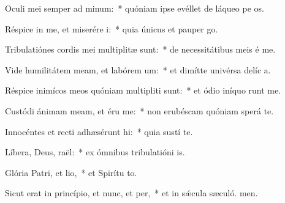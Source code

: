 \item Oculi mei semper ad minum:~* quóniam ipse evéllet de láqueo pe os.
\item Réspice in me, et miserére i:~* quia únicus et pauper  go.
\item Tribulatiónes cordis mei multiplitæ sunt:~* de necessitátibus meis é me.
\item Vide humilitátem meam, et labórem um:~* et dimítte univérsa delíc a.
\item Réspice inimícos meos quóniam multipliti sunt:~* et ódio iníquo runt me.
\item Custódi ánimam meam, et éru me:~* non erubéscam quóniam sperá  te.
\item Innocéntes et recti adhæsérunt hi:~* quia sustí te.
\item Líbera, Deus, raël:~* ex ómnibus tribulatióni is.
\item Glória Patri, et lio,~* et Spirítu to.
\item Sicut erat in princípio, et nunc, et per,~* et in sǽcula sæculó. men.
